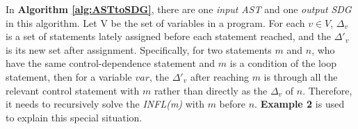 
In \textbf{Algorithm \ref{alg:ASTtoSDG}}, there are one \emph{input} \emph{AST} and one \emph{output} \emph{SDG} in this algorithm.
Let V be the set of variables in a program. For each $v \in V$, $\Delta_{v}$ is a set of statements lately assigned before each statement reached, and the $\Delta'_{v}$ is its new set after assignment.
Specifically, for two statements $m$ and $n$, who have the same control-dependence statement and $m$ is a condition of the loop statement, then for a variable $var$, the $\Delta'_{v}$ after reaching $m$ is through all the relevant control statement with $m$ rather than directly as the $\Delta_{v}$ of $n$. Therefore, it needs to recursively solve the \emph{INFL(m)} with $m$ before $n$. \textbf{Example 2} is used to explain this special situation.

